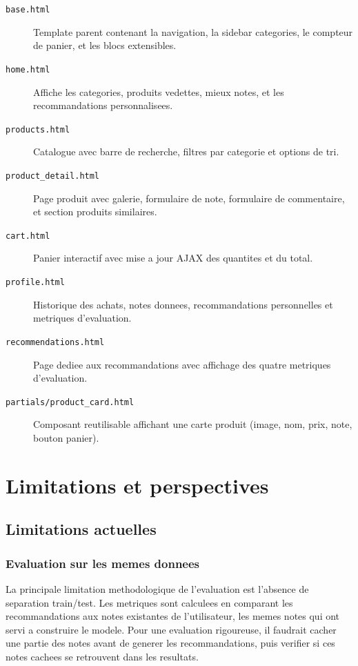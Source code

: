 \documentclass[12pt,a4paper]{report}
\newcommand{\fichier}[1]{\texttt{#1}}
\begin{document}
\begin{description}
  \item[\fichier{base.html}] Template parent contenant la navigation, la
    sidebar categories, le compteur de panier, et les blocs extensibles.
  \item[\fichier{home.html}] Affiche les categories, produits vedettes, mieux
    notes, et les recommandations personnalisees.
  \item[\fichier{products.html}] Catalogue avec barre de recherche, filtres
    par categorie et options de tri.
  \item[\fichier{product\_detail.html}] Page produit avec galerie, formulaire
    de note, formulaire de commentaire, et section produits similaires.
  \item[\fichier{cart.html}] Panier interactif avec mise a jour AJAX des
    quantites et du total.
  \item[\fichier{profile.html}] Historique des achats, notes donnees,
    recommandations personnelles et metriques d'evaluation.
  \item[\fichier{recommendations.html}] Page dediee aux recommandations avec
    affichage des quatre metriques d'evaluation.
  \item[\fichier{partials/product\_card.html}] Composant reutilisable affichant
    une carte produit (image, nom, prix, note, bouton panier).
\end{description}

\chapter{Limitations et perspectives}

\section{Limitations actuelles}

\subsection{Evaluation sur les memes donnees}

La principale limitation methodologique de l'evaluation est l'absence de
separation train/test. Les metriques sont calculees en comparant les
recommandations aux notes existantes de l'utilisateur, les memes notes qui ont
servi a construire le modele. Pour une evaluation rigoureuse, il faudrait cacher
une partie des notes avant de generer les recommandations, puis verifier si ces
notes cachees se retrouvent dans les resultats.
\end{document}
